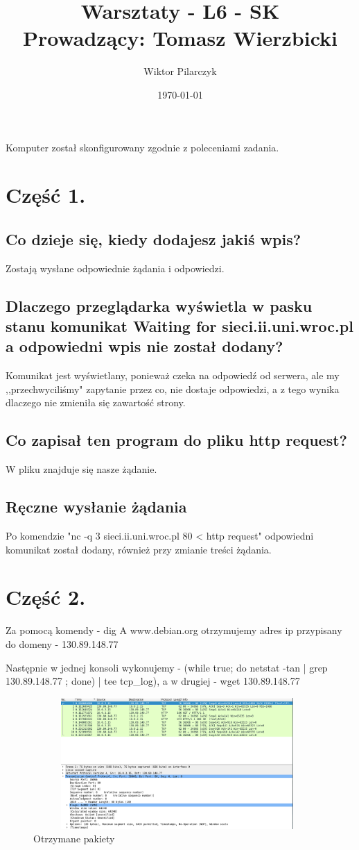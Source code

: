 \documentclass{article}
\author{Wiktor Pilarczyk}
\title{Warsztaty - L6 - SK\\\large{Prowadzący: Tomasz Wierzbicki}}
\date{\today}
\begin{document}
\maketitle
Komputer został skonfigurowany zgodnie z poleceniami zadania.
\section{Część 1.}
\subsection{Co dzieje się, kiedy dodajesz jakiś wpis?}
Zostają wysłane odpowiednie żądania i odpowiedzi.
\subsection{Dlaczego przeglądarka wyświetla w pasku stanu komunikat Waiting for sieci.ii.uni.wroc.pl a odpowiedni wpis nie został dodany?}
Komunikat jest wyświetlany, ponieważ czeka na odpowiedź od serwera, ale my ,,przechwyciliśmy" zapytanie przez co, nie dostaje odpowiedzi, a z tego wynika dlaczego nie zmieniła się zawartość strony.
\subsection{Co zapisał ten program do pliku http request?}
W pliku znajduje się nasze żądanie.
\subsection{Ręczne wysłanie żądania}
Po komendzie "nc -q 3 sieci.ii.uni.wroc.pl 80 < http request" odpowiedni komunikat został dodany, również przy zmianie treści żądania.
\newpage
\section{Część 2.}

Za pomocą komendy - dig A www.debian.org otrzymujemy adres ip przypisany do domeny - 130.89.148.77


Następnie w jednej konsoli wykonujemy - (while true; do netstat -tan | grep 130.89.148.77 ; done) | tee tcp\_log), a w drugiej - wget 130.89.148.77


\begin{figure}[!htb]
\centering
\includegraphics[width=11cm,height=5cm]{info.png}
\caption{Otrzymane pakiety}
\end{figure}
\end{document}
